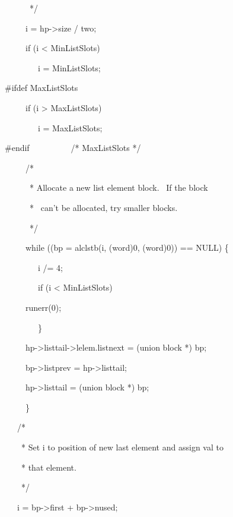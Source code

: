 {\ttfamily\mdseries
\ \  \ \ \ \ */}

{\ttfamily\mdseries
\ \  \ \ \ i = hp-{\textgreater}size / two;}

{\ttfamily\mdseries
\ \  \ \ \ if (i {\textless} MinListSlots)}

{\ttfamily\mdseries
\ \  \ \ \ \ \ \ i = MinListSlots;}

{\ttfamily\mdseries
\#ifdef MaxListSlots}

{\ttfamily\mdseries
\ \  \ \ \ if (i {\textgreater} MaxListSlots)}

{\ttfamily\mdseries
\ \  \ \ \ \ \ \ i = MaxListSlots;}

{\ttfamily\mdseries
\#endif\ \ \ \ \ \ \ \ \ \ /* MaxListSlots */}

{\ttfamily\mdseries
\ \  \ \ \ /*}

{\ttfamily\mdseries
\ \  \ \ \ \ * Allocate a new list element block. \ If the block}

{\ttfamily\mdseries
\ \  \ \ \ \ * \ can't be allocated, try smaller blocks.}

{\ttfamily\mdseries
\ \  \ \ \ \ */}

{\ttfamily\mdseries
\ \  \ \ \ while ((bp = alclstb(i, (word)0, (word)0)) == NULL) \{}

{\ttfamily\mdseries
\ \  \ \ \ \ \ \ i /= 4;}

{\ttfamily\mdseries
\ \  \ \ \ \ \ \ if (i {\textless} MinListSlots)}

{\ttfamily\mdseries
\ \ \ \  \ runerr(0);}

{\ttfamily\mdseries
\ \  \ \ \ \ \ \ \}}


\bigskip

{\ttfamily\mdseries
\ \  \ \ \ hp-{\textgreater}listtail-{\textgreater}lelem.listnext = (union block *) bp;}

{\ttfamily\mdseries
\ \  \ \ \ bp-{\textgreater}listprev = hp-{\textgreater}listtail;}

{\ttfamily\mdseries
\ \  \ \ \ hp-{\textgreater}listtail = (union block *) bp;}

{\ttfamily\mdseries
\ \  \ \ \ \}}

{\ttfamily\mdseries
\ \ \ /*}

{\ttfamily\mdseries
\ \ \ \ * Set i to position of new last element and assign val to}

{\ttfamily\mdseries
\ \ \ \ * that element.}

{\ttfamily\mdseries
\ \ \ \ */}

{\ttfamily\mdseries
\ \ \ i = bp-{\textgreater}first + bp-{\textgreater}nused;}

